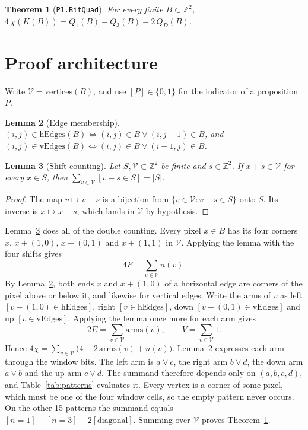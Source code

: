 \documentclass[11pt]{article}
\newtheorem{theorem}{Theorem}
\newtheorem{lemma}[theorem]{Lemma}
\theoremstyle{definition}
\theoremstyle{remark}
\begin{document}
\begin{theorem}[\texttt{P1.BitQuad}]\label{thm:main}
For every finite $B\subset\mathbb{Z}^2$,
$4\,\chi(K(B)) = Q_1(B) - Q_3(B) - 2\,Q_D(B)$.
\end{theorem}

\section{Proof architecture}

Write $\mathcal V=\mathrm{vertices}(B)$, and use $[P]\in\{0,1\}$ for the indicator
of a proposition $P$.

\begin{lemma}[Edge membership]\label{lem:edges}
$(i,j)\in\mathrm{hEdges}(B) \iff (i,j)\in B \lor (i,j-1)\in B$, and
$(i,j)\in\mathrm{vEdges}(B) \iff (i,j)\in B \lor (i-1,j)\in B$.
\end{lemma}

\begin{lemma}[Shift counting]\label{lem:shift}
Let $S,\mathcal V\subset\mathbb{Z}^2$ be finite and $s\in\mathbb{Z}^2$. If $x+s\in\mathcal V$
for every $x\in S$, then $\sum_{v\in\mathcal V}[v-s\in S]=|S|$.
\end{lemma}
\begin{proof}
The map $v\mapsto v-s$ is a bijection from $\{v\in\mathcal V: v-s\in S\}$ onto
$S$. Its inverse is $x\mapsto x+s$, which lands in $\mathcal V$ by hypothesis.
\end{proof}

Lemma~\ref{lem:shift} does all of the double counting. Every pixel $x\in B$
has its four corners $x$, $x+(1,0)$, $x+(0,1)$ and $x+(1,1)$ in $\mathcal V$.
Applying the lemma with the four shifts gives
\[
  4F = \sum_{v\in\mathcal V} n(v).
\]
By Lemma~\ref{lem:edges}, both ends $x$ and $x+(1,0)$ of a horizontal edge are
corners of the pixel above or below it, and likewise for vertical edges.
Write the arms of $v$ as left $[v-(1,0)\in\mathrm{hEdges}]$, right
$[v\in\mathrm{hEdges}]$, down $[v-(0,1)\in\mathrm{vEdges}]$ and up
$[v\in\mathrm{vEdges}]$. Applying the lemma once more for each arm gives
\[
  2E = \sum_{v\in\mathcal V}\mathrm{arms}(v), \qquad V=\sum_{v\in\mathcal V}1 .
\]
Hence $4\chi = \sum_{v\in\mathcal V}\bigl(4-2\,\mathrm{arms}(v)+n(v)\bigr)$.
Lemma~\ref{lem:edges} expresses each arm through the window bits. The left arm
is $a\lor c$, the right arm $b\lor d$, the down arm $a\lor b$ and the up arm
$c\lor d$. The summand therefore depends only on $(a,b,c,d)$, and
Table~\ref{tab:patterns} evaluates it. Every vertex is a corner of some pixel,
which must be one of the four window cells, so the empty pattern never occurs.
On the other 15 patterns the summand equals
$[n=1]-[n=3]-2[\text{diagonal}]$. Summing over $\mathcal V$ proves
Theorem~\ref{thm:main}.
\end{document}
